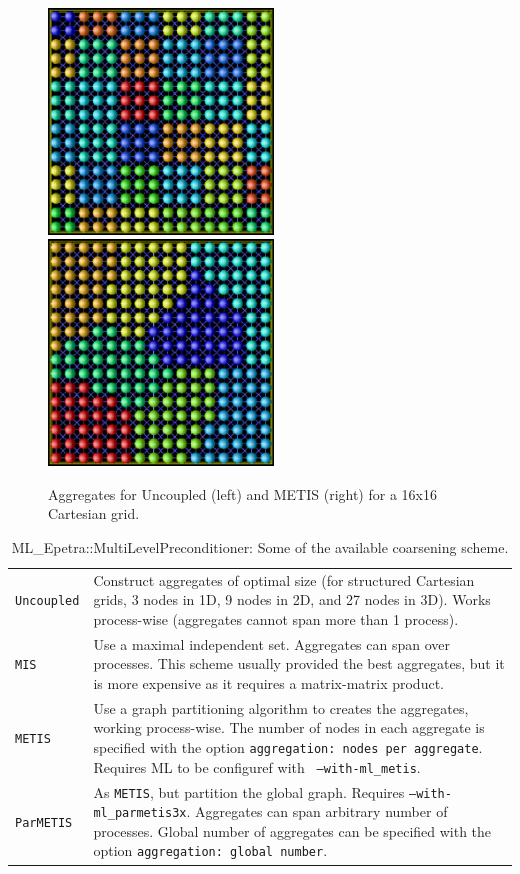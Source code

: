 \begin{figure}[htbp]
  \centering
  \includegraphics[height=6cm]{ml_Uncoupled-16x16.ps} \hspace{0.5cm}
  \includegraphics[height=6cm]{ml_METIS-16x16.ps}
  \caption{Aggregates for Uncoupled (left) and METIS (right) for a 16x16 Cartesian grid.}
  \label{fig:ml:comparison}
\end{figure}

\begin{table}
\begin{center}
\begin{tabular}{ | p{5cm} | p{10cm} | }
\hline
\verb!Uncoupled! & Construct
aggregates of optimal size (for structured Cartesian grids, 3 nodes in
1D, 9 nodes in 2D, and 27 nodes 
in 3D). Works process-wise (aggregates cannot span more than 1
process). \\
\verb!MIS! & Use a maximal independent set. Aggregates can span over
processes. This scheme usually provided the best aggregates, but it is
more expensive as it requires a matrix-matrix product. \\
\verb!METIS! & Use a graph partitioning algorithm to creates the
aggregates, working process-wise. The number of nodes in each aggregate
is specified with the option {\tt aggregation: nodes per
  aggregate}. Requires ML to be configuref with {\tt
  --with-ml\_metis}. \\
\verb!ParMETIS! & As \verb!METIS!, but partition the global
graph. Requires {\tt --with-ml\_parmetis3x}. Aggregates can span
arbitrary number of processes. Global number of aggregates can be
specified with the option {\tt aggregation: global number}. \\
\hline
\end{tabular}
\caption{ML\_Epetra::MultiLevelPreconditioner: Some of the available coarsening scheme.}
\label{tab:ml:aggr}
\end{center}
\end{table}

